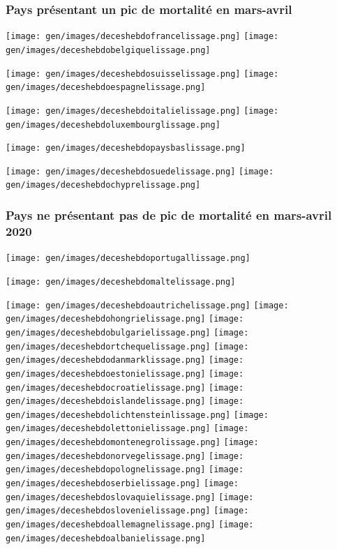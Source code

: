 \documentclass[
]{article}
\begin{document}
\hypertarget{pays-pruxe9sentant-un-pic-de-mortalituxe9-en-mars-avril}{%
\subsubsection{Pays présentant un pic de mortalité en
mars-avril}\label{pays-pruxe9sentant-un-pic-de-mortalituxe9-en-mars-avril}}

\texttt{[image: gen/images/deceshebdofrancelissage.png]}
\texttt{[image: gen/images/deceshebdobelgiquelissage.png]}

\texttt{[image: gen/images/deceshebdosuisselissage.png]}
\texttt{[image: gen/images/deceshebdoespagnelissage.png]}

\texttt{[image: gen/images/deceshebdoitalielissage.png]}
\texttt{[image: gen/images/deceshebdoluxembourglissage.png]}

\texttt{[image: gen/images/deceshebdopaysbaslissage.png]}

\texttt{[image: gen/images/deceshebdosuedelissage.png]}
\texttt{[image: gen/images/deceshebdochyprelissage.png]}

\hypertarget{pays-ne-pruxe9sentant-pas-de-pic-de-mortalituxe9-en-mars-avril-2020}{%
\subsubsection{Pays ne présentant pas de pic de mortalité en mars-avril
2020}\label{pays-ne-pruxe9sentant-pas-de-pic-de-mortalituxe9-en-mars-avril-2020}}

\texttt{[image: gen/images/deceshebdoportugallissage.png]}

\texttt{[image: gen/images/deceshebdomaltelissage.png]}

\texttt{[image: gen/images/deceshebdoautrichelissage.png]}
\texttt{[image: gen/images/deceshebdohongrielissage.png]}
\texttt{[image: gen/images/deceshebdobulgarielissage.png]}
\texttt{[image: gen/images/deceshebdortchequelissage.png]}
\texttt{[image: gen/images/deceshebdodanmarklissage.png]}
\texttt{[image: gen/images/deceshebdoestonielissage.png]}
\texttt{[image: gen/images/deceshebdocroatielissage.png]}
\texttt{[image: gen/images/deceshebdoislandelissage.png]}
\texttt{[image: gen/images/deceshebdolichtensteinlissage.png]}
\texttt{[image: gen/images/deceshebdolettonielissage.png]}
\texttt{[image: gen/images/deceshebdomontenegrolissage.png]}
\texttt{[image: gen/images/deceshebdonorvegelissage.png]}
\texttt{[image: gen/images/deceshebdopolognelissage.png]}
\texttt{[image: gen/images/deceshebdoserbielissage.png]}
\texttt{[image: gen/images/deceshebdoslovaquielissage.png]}
\texttt{[image: gen/images/deceshebdoslovenielissage.png]}
\texttt{[image: gen/images/deceshebdoallemagnelissage.png]}
\texttt{[image: gen/images/deceshebdoalbanielissage.png]}
\end{document}

